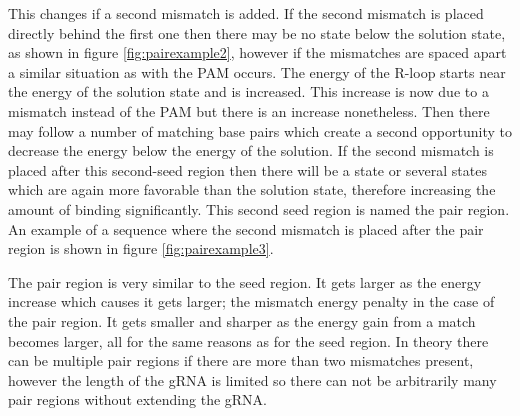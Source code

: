 
This changes if a second mismatch is added. If the second mismatch is placed directly behind the first one then there may be no state below the solution state, as shown in figure \ref{fig:pairexample2}, however if the mismatches are spaced apart a similar situation as with the PAM occurs. The energy of the R-loop starts near the energy of the solution state and is increased. This increase is now due to a mismatch instead of the PAM but there is an increase nonetheless. Then there may follow a number of matching base pairs which create a second opportunity to decrease the energy below the energy of the solution. If the second mismatch is placed after this second-seed region then there will be a state or several states which are again more favorable than the solution state, therefore increasing the amount of binding significantly. This second seed region is named the pair region. An example of a sequence where the second mismatch is placed after the pair region is shown in figure \ref{fig:pairexample3}.



The pair region is very similar to the seed region. It gets larger as the energy increase which causes it gets larger; the mismatch energy penalty in the case of the pair region. It gets smaller and sharper as the energy gain from a match becomes larger, all for the same reasons as for the seed region. In theory there can be multiple pair regions if there are more than two mismatches present, however the length of the gRNA is limited so there can not be arbitrarily many pair regions without extending the gRNA.























